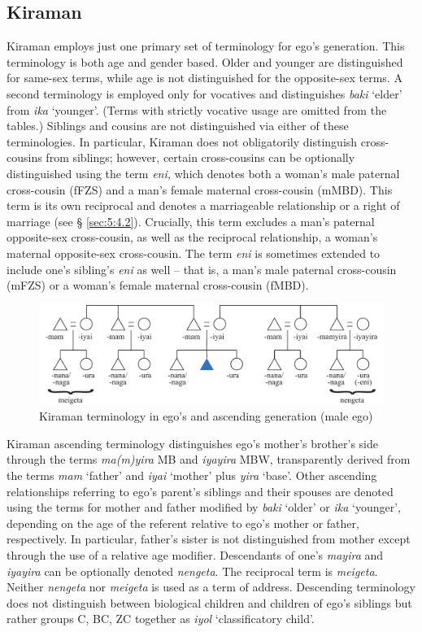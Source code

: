 \subsection{Kiraman}\label{sect_kiraman}
Kiraman employs just one primary set of terminology for ego's generation. This terminology is both age and gender based. Older and younger are distinguished for same-sex terms, while age is not distinguished for the opposite-sex terms. A second terminology is employed only for vocatives and distinguishes \textit{baki} `elder' from \textit{ika} `younger'. (Terms with strictly vocative usage are omitted from the tables.) Siblings and cousins are not distinguished via either of these terminologies. In particular, Kiraman does not obligatorily distinguish cross-cousins from siblings; however, certain cross-cousins can be optionally distinguished using the term \textit{eni,} which denotes both a woman's male paternal cross-cousin (fFZS) and a man's female maternal cross-cousin (mMBD). This term is its own reciprocal and denotes a marriageable relationship or a right of marriage (see {\S} \ref{sec:5:4.2}). Crucially, this term excludes a man's paternal opposite-sex cross-cousin, as well as the reciprocal relationship, a woman's maternal opposite-sex cross-cousin. The term\textit{ eni} is sometimes extended to include one's sibling's \textit{eni} as well -- that is, a man's male paternal cross-cousin (mFZS) or a woman's female maternal cross-cousin (fMBD). 

\begin{figure}
\includegraphics[width=\textwidth]{figures/Holton_ch5_fig8.pdf}
\caption{Kiraman terminology in ego's and ascending generation (male ego)}
\end{figure}  

Kiraman ascending terminology distinguishes ego's mother's brother's side through the terms \textit{ma(m)yira} MB and \textit{iyayira} MBW, transparently derived from the terms \textit{mam} `father' and \textit{iyai} `mother' plus \textit{yira} `base'. Other ascending relationships referring to ego's parent's siblings and their spouses are denoted using the terms for mother and father modified by \textit{baki} `older' or \textit{ika} `younger', depending on the age of the referent relative to ego's mother or father, respectively. In particular, father's sister is not distinguished from mother except through the use of a relative age modifier. Descendants of one's \textit{mayira} and \textit{iyayira} can be optionally denoted \textit{nengeta}. The reciprocal term is \textit{meigeta}. Neither \textit{nengeta} nor \textit{meigeta} is used as a term of address. Descending terminology does not distinguish between biological children and children of ego's siblings but rather groups C, BC, ZC together as \textit{iyol} `classificatory child'.

